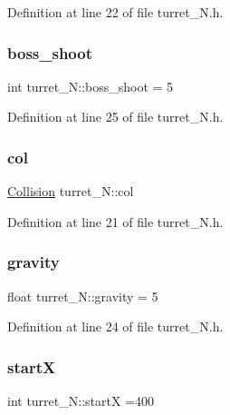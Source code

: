 Definition at line 22 of file turret\+\_\+\+N.\+h.

\hypertarget{classturret___n_aa03c9565d470def091f734fd03fb0c05}{}\label{classturret___n_aa03c9565d470def091f734fd03fb0c05} 
\subsubsection{\texorpdfstring{boss\+\_\+shoot}{boss\_shoot}}
{\footnotesize\ttfamily int turret\+\_\+\+N\+::boss\+\_\+shoot = 5}



Definition at line 25 of file turret\+\_\+\+N.\+h.

\hypertarget{classturret___n_a47ca04d396895b039912283c18455ef1}{}\label{classturret___n_a47ca04d396895b039912283c18455ef1} 
\subsubsection{\texorpdfstring{col}{col}}
{\footnotesize\ttfamily \hyperlink{class_collision}{Collision} turret\+\_\+\+N\+::col}



Definition at line 21 of file turret\+\_\+\+N.\+h.

\hypertarget{classturret___n_aa3666332ec632f9f9262706819651f2d}{}\label{classturret___n_aa3666332ec632f9f9262706819651f2d} 
\subsubsection{\texorpdfstring{gravity}{gravity}}
{\footnotesize\ttfamily float turret\+\_\+\+N\+::gravity = 5}



Definition at line 24 of file turret\+\_\+\+N.\+h.

\hypertarget{classturret___n_abce9e96f486c4f2144c7d23f605c20d0}{}\label{classturret___n_abce9e96f486c4f2144c7d23f605c20d0} 
\subsubsection{\texorpdfstring{startX}{startX}}
{\footnotesize\ttfamily int turret\+\_\+\+N\+::startX =400}



